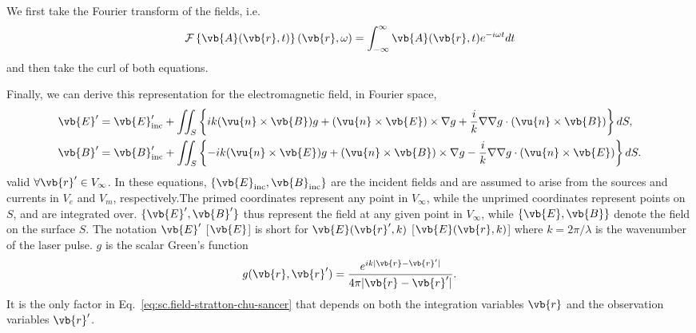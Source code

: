 \documentclass[11pt,SymmetricalJury]{inrsthesis/inrsthesis}
\begin{document}
We first take the Fourier transform of the fields, i.e.
  \begin{equation}
    \mathcal{F}\left\{\vb{A}(\vb{r},t)\right\}(\vb{r},\omega)
                      = \int_{-\infty}^\infty \vb{A}(\vb{r},t)e^{-i\omega t }dt
  \end{equation}
and then take the curl of both equations.

Finally, we can derive this representation for the electromagnetic field,
in Fourier space,
  \begin{subequations}
  \label{eq:sc.field-stratton-chu-sancer}
  \begin{align}
  \vb{E}' &=
     \vb{E}_\text{inc}'+\iint_{S}
    \left\{ ik(\vu{n}\times \vb{B})              g
          +   (\vu{n}\times \vb{E})\times \nabla g
          +\frac{i}{k}\nabla\nabla g\cdot(\vu{n}\times\vb{B})
    \right\} dS,
  \label{eq:sc.efield-stratton-chu-sancer}\\
  \vb{B}' &=
    \vb{B}_\text{inc}' + \iint_{S}
    \left\{-ik(\vu{n}\times \vb{E})              g
          +   (\vu{n}\times \vb{B})\times \nabla g
          -\frac{i}{k}\nabla\nabla g\cdot(\vu{n}\times\vb{E})
    \right\} dS.
  \label{eq:sc.bfield-stratton-chu-sancer}
  \end{align}
  \end{subequations}
valid $\forall\vb{r}'\in V_\infty$. In these equations, $\{\vb{E}_\text{inc},\vb{B}_\text{inc}\}$
are the incident fields and are assumed
to arise from the sources and currents in $V_e$ and $V_m$, respectively.The primed coordinates
represent any point in $V_\infty$, while the unprimed coordinates represent points
on $S$, and are integrated over. $\{\vb{E}', \vb{B}'\}$ thus represent the field at any
given point in $V_\infty$, while $\{\vb{E}, \vb{B}\}$ denote the field on the surface $S$.
The notation $\vb{E}'$ [$\vb{E}$] is short for $\vb{E}(\vb{r}',k)$ [$\vb{E}(\vb{r},k)$]
where $k=2\pi/\lambda$ is the wavenumber of the laser pulse. $g$ is the scalar Green's function
  \begin{equation}
    g(\vb{r},\vb{r}') = \frac{e^{ik|\vb{r}-\vb{r}'|}}{4\pi|\vb{r}-\vb{r}'|}.
  \end{equation}
It is the only factor in Eq.~\eqref{eq:sc.field-stratton-chu-sancer}
that depends on both the integration variables $\vb{r}$
and the observation variables $\vb{r}'$.
\end{document}
